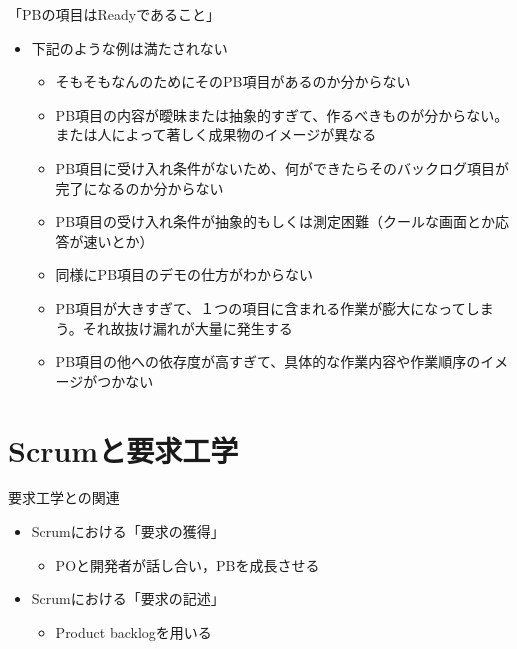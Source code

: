 \documentclass[t]{beamer}
\begin{document}
\begin{frame}[label=sec-2-4]{「PBの項目はReadyであること」}
\begin{itemize}
\item 下記のような例は満たされない
\begin{itemize}
\item そもそもなんのためにそのPB項目があるのか分からない
\item PB項目の内容が曖昧または抽象的すぎて、作るべきものが分からない。または人によって著しく成果物のイメージが異なる
\item PB項目に受け入れ条件がないため、何ができたらそのバックログ項目が完了になるのか分からない
\item PB項目の受け入れ条件が抽象的もしくは測定困難（クールな画面とか応答が速いとか）
\item 同様にPB項目のデモの仕方がわからない
\item PB項目が大きすぎて、１つの項目に含まれる作業が膨大になってしまう。それ故抜け漏れが大量に発生する
\item PB項目の他への依存度が高すぎて、具体的な作業内容や作業順序のイメージがつかない
\end{itemize}
\end{itemize}
\end{frame}

\section{Scrumと要求工学}
\label{sec-3}
\begin{frame}[label=sec-3-1]{要求工学との関連}
\begin{itemize}
\item Scrumにおける「要求の獲得」
\begin{itemize}
\item POと開発者が話し合い，PBを成長させる
\end{itemize}
\item Scrumにおける「要求の記述」
\begin{itemize}
\item Product backlogを用いる
\end{itemize}
\end{itemize}
\end{frame}
\end{document}
